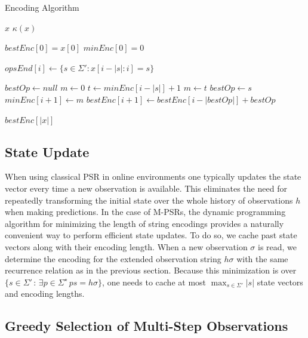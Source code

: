 \documentclass[letterpaper]{article}
\newcommand{\sstar}{\Sigma^\star}
\begin{document}
\begin{algorithm}
\caption{Encoding Algorithm}
\label{Encoding Algorithm}
\begin{algorithmic}[1]
\INPUT $x$
\OUTPUT $\kappa(x)$


\State $bestEnc[0] = x[0]$
\State $minEnc[0] = 0$

	 \State $opsEnd[i] \gets \{s \in \Sigma' : x[i-|s|:i] = s\}$
\EndFor

	\State $bestOp \gets null$
	\State $m \gets 0$ 
		\State $t \gets minEnc[i-|s|] + 1$
			\State $m \gets t$ 
			\State $bestOp \gets s$
		\EndIf
	\EndFor
	\State $minEnc[i+1] \gets m$
	\State $bestEnc[i+1] \gets bestEnc[i-|bestOp|] + bestOp$
\EndFor

\State \Return $bestEnc[|x|]$

\EndProcedure
\end{algorithmic}
\end{algorithm}

\subsection{State Update}

When using classical PSR in online environments one typically updates the state vector every time a new observation is available. This eliminates the need for repeatedly transforming the initial state over the whole history of observations $h$ when making predictions. In the case of M-PSRs, the dynamic programming algorithm for minimizing the length of string encodings provides a naturally convenient way to perform efficient state updates. To do so, we cache past state vectors along with their encoding length. When a new observation $\sigma$ is read, we determine the encoding for the extended observation string $h \sigma$ with the same recurrence relation as in the previous section. Because this minimization is over $\{s \in \Sigma' \,:\, \exists p \in \sstar \, ps= h\sigma\}$, one needs to cache at most $\max_{s \in \Sigma'} |s|$ state vectors and encoding lengths. 

\subsection{Greedy Selection of Multi-Step Observations}
\end{document}
